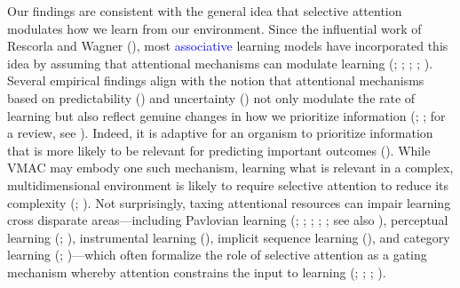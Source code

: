 \documentclass[
  man,
  floatsintext,
  longtable,
  nolmodern,
  notxfonts,
  notimes,
  mask,
  colorlinks=true,linkcolor=blue,citecolor=blue,urlcolor=blue]{apa7}
\begin{document}
Our findings are consistent with the general idea that selective
attention modulates how we learn from our environment. Since the
influential work of Rescorla and Wagner
(), most
\textcolor{blue}{associative} learning models have incorporated this
idea by assuming that attentional mechanisms can modulate learning
(;
;
;
;
). Several empirical
findings align with the notion that attentional mechanisms based on
predictability () and
uncertainty () not only
modulate the rate of learning but also reflect genuine changes in how we
prioritize information (; ; for a
review, see ).
Indeed, it is adaptive for an organism to prioritize information that is
more likely to be relevant for predicting important outcomes
(). While VMAC may embody one such mechanism, learning what
is relevant in a complex, multidimensional environment is likely to
require selective attention to reduce its complexity
(;
). Not surprisingly,
taxing attentional resources can impair learning cross disparate
areas---including Pavlovian learning
(;
;
;
; ; see also ), perceptual learning (; ),
instrumental learning (), implicit sequence learning
(), and category
learning (;
)---which often
formalize the role of selective attention as a gating mechanism whereby
attention constrains the input to learning
(;
;
;
).
\end{document}
